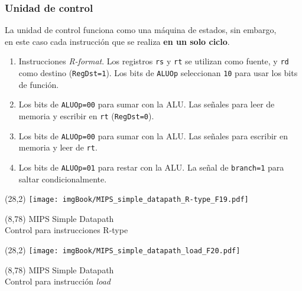 \documentclass[aspectratio=169]{beamer}
\begin{document}
\begin{frame}[t,fragile]
    \frametitle{Unidad de control}
    La unidad de control funciona como una máquina de estados, sin embargo,\\
    en este caso cada instrucción que se realiza \textbf{en un solo ciclo}.\\
    \small
    \begin{enumerate}
     \item<3-> Instrucciones \emph{R-format}. Los registros \texttt{rs} y \texttt{rt} se utilizan como fuente, y \texttt{rd} como destino (\texttt{RegDst=1}). Los bits de \texttt{ALUOp} seleccionan \texttt{10} para usar los bits de función.
     \item<4-> Los bits de \texttt{ALUOp=00} para sumar con la ALU. Las señales para leer de memoria y escribir en \texttt{rt} (\texttt{RegDst=0}).
     \item<5-> Los bits de \texttt{ALUOp=00} para sumar con la ALU. Las señales para escribir en memoria y leer de \texttt{rt}.
     \item<6-> Los bits de \texttt{ALUOp=01} para restar con la ALU. La señal de \texttt{branch=1} para saltar condicionalmente. 
    \end{enumerate}
\end{frame}

\begin{frame}[t,fragile]
    \begin{textblock}{80}(28,2)
    \texttt{[image: imgBook/MIPS\_simple\_datapath\_R-type\_F19.pdf]}
    \end{textblock}
    \begin{textblock}{80}(8,78)
    \textcolor{naranjauca}{\Large MIPS Simple Datapath\\ \normalsize Control para instrucciones R-type}
    \end{textblock}
\end{frame}

\begin{frame}[t,fragile]
    \begin{textblock}{80}(28,2)
    \texttt{[image: imgBook/MIPS\_simple\_datapath\_load\_F20.pdf]}
    \end{textblock}
    \begin{textblock}{80}(8,78)
    \textcolor{naranjauca}{\Large MIPS Simple Datapath\\ \normalsize Control para instrucción \emph{load}}
    \end{textblock}
\end{frame}
\end{document}
